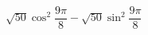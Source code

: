 \begin{ex}[type=expression]
	\begin{condition}
		\( \sqrt{50}\cos^2\dfrac{9\pi}{8}-\sqrt{50}\sin^2\dfrac{9\pi}{8} \)
	\end{condition}
\end{ex}